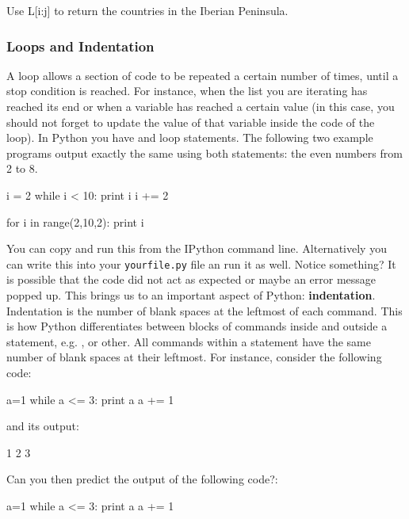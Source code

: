 \begin{exercise}
 Use L[i:j] to return the countries in the Iberian Peninsula.
\end{exercise}

\subsubsection{Loops and Indentation}

A loop allows a section of code to be repeated a certain number of times, until a stop condition is reached. For instance, when the list you are iterating has reached its end or when a variable has reached a certain value (in this case, you should not forget to update the value of that variable inside the code of the loop). In Python you have  and  loop statements. The following two example programs output exactly the same using both statements: the even numbers from 2 to 8.

\begin{python}
i = 2
while i < 10:
  print i  
  i += 2 
\end{python}

\begin{python}
for i in range(2,10,2):
    print i
\end{python}

You can copy and run this from the IPython command line. Alternatively you can write this into your \texttt{yourfile.py} file an run it as well. Notice something? It is possible that the code did not act as expected or maybe an error message popped up. This brings us to an important aspect of Python: \textbf{indentation}. Indentation is the number of blank spaces at the leftmost of each command. This is how Python differentiates between blocks of commands inside and outside a statement, e.g. ,  or other. All commands within a statement have the same number of blank spaces at their leftmost. For instance, consider the following code: 

\begin{python}
a=1
while a <= 3:
    print a
    a += 1
\end{python}

\noindent and its output:

\begin{python}
1
2
3
\end{python}


\begin{exercise}
Can you then predict the output of the following code?:

\begin{python}
a=1
while a <= 3:
    print a
a += 1
\end{python}

\end{exercise}

